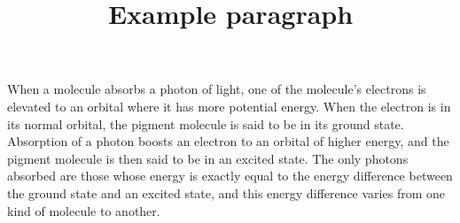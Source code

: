 \documentclass[11pt]{article}
\title{Example paragraph}
\author{}
\date{}
\begin{document}
\maketitle


When a molecule absorbs a photon of light, one of the molecule's
electrons is elevated to an orbital where it has more potential
energy. When the electron is in its normal orbital, the pigment
molecule is said to be in its ground state. Absorption of a photon
boosts an electron to an orbital of higher energy, and the pigment
molecule is then said to be in an excited state. The only photons
absorbed are those whose energy is exactly equal to the energy
difference between the ground state and an excited state, and this
energy difference varies from one kind of molecule to another.
\end{document}
